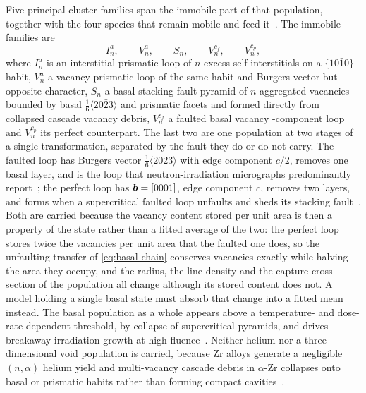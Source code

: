 Five principal cluster families span the immobile part of that population,
together with the four species that remain mobile and feed
it~\citep{Carpenter1988,Northwood1977,OnimusBechade2012,Yi2013,Doriot2015}. The
immobile families are
\begin{equation}
  I_n^{a},\qquad V_n^{a},\qquad S_n,\qquad V_n^{c_f},\qquad V_n^{c_p},
  \label{eq:zr-loop-classes}
\end{equation}
where $I_n^{a}$ is an interstitial prismatic \aloop{} loop of $n$ excess
self-interstitials on a $\{10\bar10\}$ habit, $V_n^{a}$ a vacancy prismatic loop
of the same habit and Burgers vector but opposite character, $S_n$ a basal
stacking-fault pyramid of $n$ aggregated vacancies bounded by basal
$\tfrac16\langle20\bar23\rangle$ and prismatic facets and formed directly from
collapsed cascade vacancy debris, $V_n^{c_f}$ a faulted basal vacancy
\cloop{}-component loop and $V_n^{c_p}$ its perfect counterpart. The last two are
one population at two stages of a single transformation, separated by the fault
they do or do not carry. The faulted loop has Burgers vector
$\tfrac16\langle20\bar23\rangle$ with edge component $c/2$, removes one basal
layer, and is the \cloop{} loop that neutron-irradiation micrographs
predominantly report~\citep{jostsons1977nature,griffiths1988review,carpenter1981study};
the perfect loop has $\bm{b}=[0001]$, edge component $c$, removes two layers, and
forms when a supercritical faulted loop unfaults and sheds its stacking
fault~\citep{christiaen2019new,dai2021stability,varvenne2014vacancy}. Both are
carried because the vacancy content stored per unit area is then a property of
the state rather than a fitted average of the two: the perfect loop stores twice
the vacancies per unit area that the faulted one does, so the unfaulting transfer
of \cref{eq:basal-chain} conserves vacancies exactly while halving the area they
occupy, and the radius, the line density and the capture cross-section of the
population all change although its stored content does not. A model holding a
single basal state must absorb that change into a fitted mean instead. The basal
population as a whole appears above a temperature- and dose-rate-dependent
threshold, by collapse of supercritical pyramids, and drives breakaway
irradiation growth at high fluence~\citep{holt1986c,HoltCausey1993,Yi2013}.
Neither helium nor a three-dimensional void population is carried, because Zr
alloys generate a negligible $(n,\alpha)$ helium yield and multi-vacancy cascade
debris in $\alpha$-Zr collapses onto basal or prismatic habits rather than
forming compact cavities~\citep{Northwood1977,OnimusBechade2012}.

